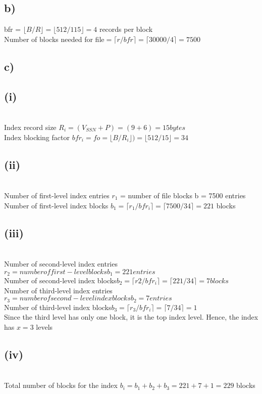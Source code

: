 \documentclass[11pt]{article}
\theoremstyle{plain}
\theoremstyle{definition}
\begin{document}
\subsection*{b)}
bfr = $\lfloor B/R \rfloor = \lfloor 512/115 \rfloor = 4$ records per block\\

Number of blocks needed for file$ = \lceil r/bfr \rceil = \lceil 30000/4 \rceil = 7500$
\subsection*{c)}
\subsection*{(i)}\\
Index record size $R_i = (V_{SSN} + P) = (9 + 6) = 15 bytes$\\
Index blocking factor $bfr_i= fo = \lfloor B/R_i \rfloor
 ) = \lfloor 512/15 \rfloor = 34 $ \\
\subsection*{(ii)}\\
Number of first-level index entries $r_1$
 = number of file blocks b = 7500 entries \\
Number of first-level index blocks $b_1= \lceil r_1/ bfr_i \rceil = \lceil 7500/34 \rceil = 221$ blocks \\
\subsection*{(iii)}\\

Number of second-level index entries $r_2= number of first-level blocks b_1
= 221 entries $\\
Number of second-level index blocks$ b_2 = \lceil r 2 /bfr_i \rceil = \lceil 221/34 \rceil 
= 7 blocks$ \\
Number of third-level index entries $r_3 = number of second-level index blocks b_2 = 7 entries $ \\
Number of third-level index blocks$ b_3 = \lceil r_3 / bfr_i\rceil = \lceil 7/34 \rceil = 1 $ \\
Since the third level has only one block, it is the top index level. 
Hence, the index has $x = 3$ levels \\

\subsection*{(iv)}\\
Total number of blocks for the index $b_i= b_1 + b_2 + b_3= 221 + 7 + 1 = 229$ blocks \\
\end{document}
